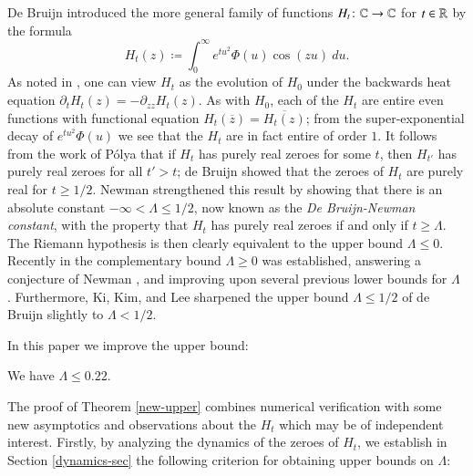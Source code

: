 De Bruijn \cite{debr} introduced the more general family of functions $H_t \colon \mathbb{C} \to \mathbb{C}$ for $t \in \mathbb{R}$ by the formula
\begin{equation}\label{htdef}
 H_t(z) \coloneqq \int_0^\infty e^{tu^2} \Phi(u) \cos(zu)\ du.
\end{equation}
As noted in \cite[p.114]{csv}, one can view $H_t$ as the evolution of $H_0$ under the backwards heat equation $\partial_t H_t(z)= -\partial_{zz} H_t(z)$.
As with $H_0$, each of the $H_t$ are entire even functions with functional equation $H_t(\overline{z}) = \overline{H_t(z)}$; from the super-exponential decay of $e^{tu^2} \Phi(u)$ we see that the $H_t$ are in fact entire of order $1$.  It follows from the work of P\'olya \cite{polya} that if $H_t$ has purely real zeroes for some $t$, then $H_{t'}$ has purely real zeroes for all $t'>t$; de Bruijn showed that the zeroes of $H_t$ are purely real for $t \geq 1/2$.  Newman \cite{newman} strengthened this result by showing that there is an absolute constant $-\infty < \Lambda \leq 1/2$, now known as the \emph{De Bruijn-Newman constant}, with the property that $H_t$ has purely real zeroes if and only if $t \geq \Lambda$.  The Riemann hypothesis is then clearly equivalent to the upper bound $\Lambda \leq 0$.  Recently in \cite{brad} the complementary bound $\Lambda \geq 0$ was established, answering a conjecture of Newman \cite{newman}, and improving upon several previous lower bounds for $\Lambda$ \cite{cnv,nrv,crv,cosv,odlyzko,saouter}.  Furthermore, Ki, Kim, and Lee \cite{kkl} sharpened the upper bound $\Lambda \leq 1/2$ of de Bruijn \cite{debr} slightly to $\Lambda < 1/2$.  

In this paper we improve the upper bound:

\begin{theorem}\label{new-upper}  We have $\Lambda \leq 0.22$.
\end{theorem}

The proof of Theorem \ref{new-upper} combines numerical verification with some new asymptotics and observations about the $H_t$ which may be of independent interest.  Firstly, by analyzing the dynamics of the zeroes of $H_t$, we establish in Section \ref{dynamics-sec} the following criterion for obtaining upper bounds on $\Lambda$:


